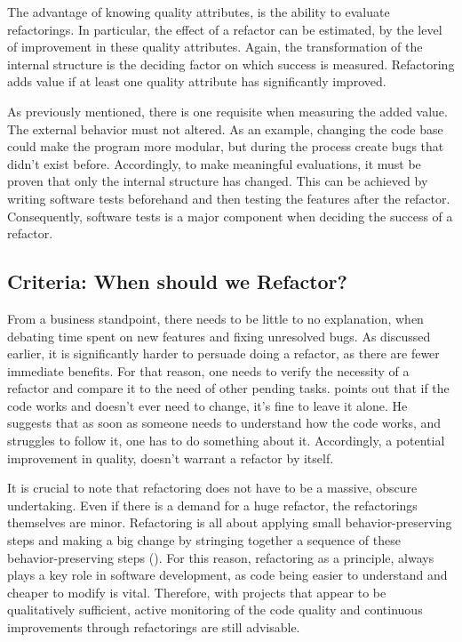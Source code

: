 The advantage of knowing quality attributes, is the ability to evaluate refactorings. 
In particular, the effect of a refactor can be estimated, 
	by the level of improvement in these quality attributes.
Again, the transformation of the internal structure 
	is the deciding factor on which success is measured.
Refactoring adds value if at least one quality attribute has significantly improved.

As previously mentioned, there is one requisite when measuring the added value.
The external behavior must not altered. 
As an example, changing the code base could make the program more modular, 
	but during the process create bugs that didn't exist before. 
Accordingly, to make meaningful evaluations, 
	it must be proven that only the internal structure has changed.
This can be achieved by writing software tests beforehand 
	and then testing the features after the refactor.
Consequently, software tests is a major component when deciding the success of a refactor.



\subsection{Criteria: When should we Refactor?}

From a business standpoint, there needs to be little to no explanation, 
	when debating time spent on new features and fixing unresolved bugs.
As discussed earlier, it is significantly harder to persuade doing a refactor, 
	as there are fewer immediate benefits.
For that reason, one needs to verify the necessity of a refactor 
	and compare it to the need of other pending tasks.
\textcite[p.~5]{fowler2018} points out that if the code works and doesn't ever need to change, 
	it's fine to leave it alone.
He suggests that as soon as someone needs to understand how the code works, 
	and struggles to follow it, one has to do something about it.
Accordingly, a potential improvement in quality, doesn't warrant a refactor by itself.

It is crucial to note that refactoring does not have to be a massive, obscure undertaking.
Even if there is a demand for a huge refactor, the refactorings themselves are minor.
Refactoring is all about applying small behavior-preserving steps 
	and making a big change by stringing together a sequence of these behavior-preserving steps (\cite[p.~45]{fowler2018}). 
For this reason, refactoring as a principle, 
	always plays a key role in software development, 
	as code being easier to understand and cheaper to modify is vital.
Therefore, with projects that appear to be qualitatively sufficient, 
	active monitoring of the code quality and continuous improvements 
	through refactorings are still advisable.

